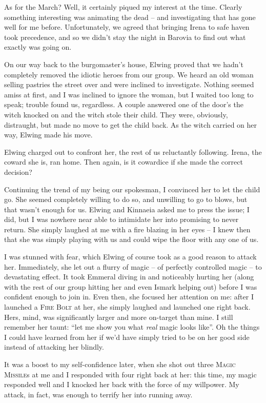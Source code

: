 As for the March? Well, it certainly piqued my interest at the time. Clearly something interesting was animating the dead -- and investigating that has gone well for me before. Unfortunately, we agreed that bringing Irena to safe haven took precedence, and so we didn't stay the night in Barovia to find out what exactly was going on.

On our way back to the burgomaster's house, Elwing proved that we hadn't completely removed the idiotic heroes from our group. We heard an old woman selling pastries the street over and were inclined to investigate. Nothing seemed amiss at first, and I was inclined to ignore the woman, but I waited too long to speak; trouble found us, regardless. A couple answered one of the door's the witch knocked on and the witch stole their child. They were, obviously, distraught, but made no move to get the child back. As the witch carried on her way, Elwing made his move.

Elwing charged out to confront her, the rest of us reluctantly following. Irena, the coward she is, ran home. Then again, is it cowardice if she made the correct decision?

Continuing the trend of my being our spokesman, I convinced her to let the child go. She seemed completely willing to do so, and unwilling to go to blows, but that wasn't enough for us. Elwing and Kinnaeia asked me to press the issue; I did, but I was nowhere near able to intimidate her into promising to never return. She simply laughed at me with a fire blazing in her eyes -- I knew then that she was simply playing with us and could wipe the floor with any one of us.

I was stunned with fear, which Elwing of course took as a good reason to attack her. Immediately, she let out a flurry of magic -- of perfectly controlled magic -- to devastating effect. It took Emmeral diving in and noticeably hurting her (along with the rest of our group hitting her and even Ismark helping out) before I was confident enough to join in. Even then, she focused her attention on me: after I launched a \textsc{Fire Bolt} at her, she simply laughed and launched one right back. Hers, mind, was significantly larger and more on-target than mine. I still remember her taunt: ``let me show you what \emph{real} magic looks like''. Oh the things I could have learned from her if we'd have simply tried to be on her good side instead of attacking her blindly.

It was a boost to my self-confidence later, when she shot out three \textsc{Magic Missile}s at me and I responded with four right back at her: this time, my magic responded well and I knocked her back with the force of my willpower. My attack, in fact, was enough to terrify her into running away.

